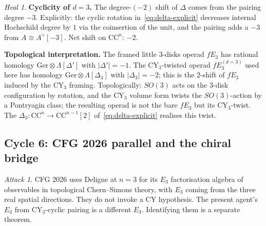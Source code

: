 \documentclass[11pt]{article}
\theoremstyle{definition}
\theoremstyle{remark}
\newtheorem*{attack}{Attack}
\newtheorem*{heal}{Heal}
\newcommand{\CC}{\mathrm{CC}}
\newcommand{\Ger}{\mathrm{Ger}}
\begin{document}
\begin{heal}
\textbf{Cyclicity of $d = 3$.} The degree-$(-2)$ shift of $\Delta$
comes from the pairing degree $-3$. Explicitly: the cyclic rotation
in~\eqref{eq:delta-explicit} decreases internal Hochschild degree by
$1$ via the coinsertion of the unit, and the pairing adds a $-3$
from $A \cong A^\vee[-3]$. Net shift on $\CC^n$: $-2$.

\textbf{Topological interpretation.} The framed little $3$-disks
operad $fE_3$ has rational homology $\Ger \otimes \Lambda[\Delta']$
with $|\Delta'| = -1$. The CY$_3$-twisted operad $fE_3^{(d=3)}$ used
here has homology $\Ger \otimes \Lambda[\Delta_3]$ with
$|\Delta_3| = -2$; this is the $2$-shift of $fE_3$ induced by the
CY$_3$ framing. Topologically: $SO(3)$ acts on the $3$-disk
configuration by rotation, and the CY$_3$ volume form twists the
$SO(3)$-action by a Pontryagin class; the resulting operad is not
the bare $fE_3$ but its CY$_3$-twist. The $\Delta_3 : \CC^n \to
\CC^{n-1}[2]$ of~\eqref{eq:delta-explicit} realises this twist.
\end{heal}

\subsection*{Cycle 6: CFG 2026 parallel and the chiral bridge}

\begin{attack}
CFG 2026 uses Deligne at $n=3$ for its $E_3$ factorisation algebra
of observables in topological Chern--Simons theory, with $E_3$
coming from the three real spatial directions. They do not invoke a
CY hypothesis. The present agent's $E_3$ from CY$_3$-cyclic pairing
is a different $E_3$. Identifying them is a separate theorem.
\end{attack}
\end{document}

